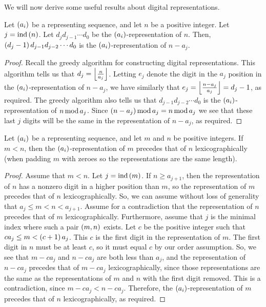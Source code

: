 \documentclass[english,12pt]{article}
\newcommand{\seq}{\p}
\DeclareMathOperator{\ind}{ind}
\begin{document}
We will now derive some useful results about digital representations.
\begin{prop}\label{prop:cutoff}
Let $\seq{a_i}$ be a representing sequence, and let $n$ be a positive integer.  Let $j=\ind\p{n}$.  Let $d_jd_{j-1}\cdots d_0$ be the $\seq{a_i}$-representation of $n$.  Then, $\left(d_j-1\right)d_{j-1}d_{j-2}\cdots d_0$ is the $\seq{a_i}$-representation of $n-a_j$.
\end{prop}
\begin{proof}
Recall the greedy algorithm for constructing digital representations.  This algorithm tells us that $d_j=\left\lfloor\frac{n}{a_j}\right\rfloor$.  Letting $e_j$ denote the digit in the $a_j$ position in the $\seq{a_i}$-representation of $n-a_j$, we have similarly that $e_j=\left\lfloor\frac{n-a_j}{a_j}\right\rfloor=d_j-1$, as required.  The greedy algorithm also tells us that $d_{j-1}d_{j-2}\cdots d_0$ is the $\seq{a_i}$-representation of $n\operatorname{mod} a_j$.  Since $\left(n-a_j\right)\operatorname{mod} a_j=n\operatorname{mod} a_j$ we see that these last $j$ digits will be the same in the representation of $n-a_j$, as required.
\end{proof}
\begin{prop}\label{prop:lexdig}
Let $\seq{a_i}$ be a representing sequence, and let $m$ and $n$ be positive integers.  If $m<n$, then the $\seq{a_i}$-representation of $m$ precedes that of $n$ lexicographically (when padding $m$ with zeroes so the representations are the same length).
\end{prop}
\begin{proof}
Assume that $m<n$.  Let $j=\ind\p{m}$.  If $n\geq a_{j+1}$, then the representation of $n$ has a nonzero digit in a higher position than $m$, so the representation of $m$ precedes that of $n$ lexicographically.
So, we can assume without loss of generality that $a_j\leq m<n<a_{j+1}$.  Assume for a contradiction that the representation of $n$ precedes that of $m$ lexicographically. Furthermore, assume that $j$ is the minimal index where such a pair $\left(m,n\right)$ exists.  Let $c$ be the positive integer such that $ca_j\leq m<\left(c+1\right)a_j$.  This $c$ is the first digit in the representation of $m$.  The first digit in $n$ must be at least $c$, so it must equal $c$ by our order assumption.  So, we see that $m-ca_j$ and $n-ca_j$ are both less than $a_j$, and  the representation of $n-ca_j$ precedes that of $m-ca_j$ lexicographically, since those representations are the same as the representations of $m$ and $n$ with the first digit removed.  This is a contradiction, since $m-ca_j<n-ca_j$.  Therefore, the $\seq{a_i}$-representation of $m$ precedes that of $n$ lexicographically, as required.
\end{proof}
\end{document}
